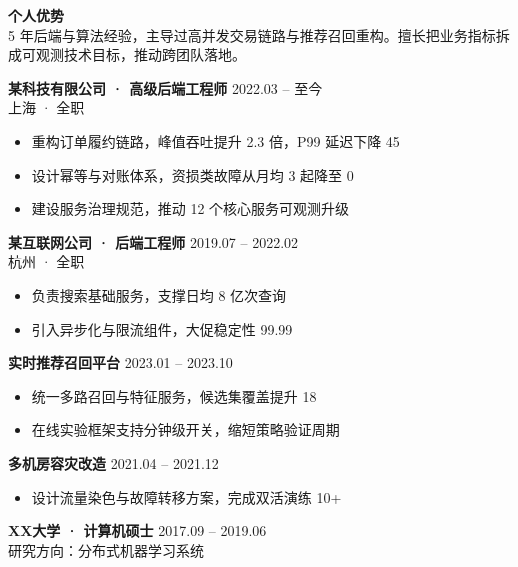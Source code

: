 \documentclass[UTF8,a4paper,10.5pt]{ctexart}
\begin{document}
\begin{minipage}[t]{0.72\paperwidth}
  \hspace{1.0cm}
  \begin{minipage}[t]{0.62\paperwidth}
    \vspace{1.5cm}
    {\fontsize{20}{24}\selectfont\bfseries\sffamily 个人优势}\\[0.35em]
    {\small 5 年后端与算法经验，主导过高并发交易链路与推荐召回重构。擅长把业务指标拆成可观测技术目标，推动跨团队落地。}

    {\bfseries 某科技有限公司 · 高级后端工程师} \hfill 2022.03 -- 至今\\
    {\small\color{muted} 上海 · 全职}\\[0.2em]
    {\small
      \begin{itemize}
        \item 重构订单履约链路，峰值吞吐提升 2.3 倍，P99 延迟下降 45\\%
        \item 设计幂等与对账体系，资损类故障从月均 3 起降至 0
        \item 建设服务治理规范，推动 12 个核心服务可观测升级
      \end{itemize}}

    {\bfseries 某互联网公司 · 后端工程师} \hfill 2019.07 -- 2022.02\\
    {\small\color{muted} 杭州 · 全职}\\[0.2em]
    {\small
      \begin{itemize}
        \item 负责搜索基础服务，支撑日均 8 亿次查询
        \item 引入异步化与限流组件，大促稳定性 99.99\\%
      \end{itemize}}

    {\bfseries 实时推荐召回平台} \hfill 2023.01 -- 2023.10\\
    {\small
      \begin{itemize}
        \item 统一多路召回与特征服务，候选集覆盖提升 18\\%
        \item 在线实验框架支持分钟级开关，缩短策略验证周期
      \end{itemize}}

    {\bfseries 多机房容灾改造} \hfill 2021.04 -- 2021.12\\
    {\small
      \begin{itemize}
        \item 设计流量染色与故障转移方案，完成双活演练 10+
      \end{itemize}}

    {\bfseries XX大学 · 计算机硕士} \hfill 2017.09 -- 2019.06\\
    {\small 研究方向：分布式机器学习系统}
  \end{minipage}
\end{minipage}
\end{document}
